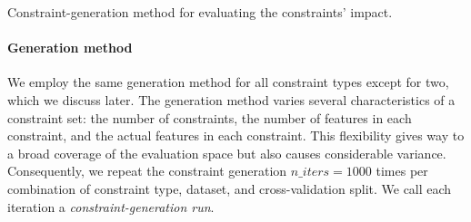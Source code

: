 \begin{algorithm}[t]
	\DontPrintSemicolon
	\BlankLine
	\caption{Constraint-generation method for evaluating the constraints' impact.}
	\label{al:syn:constraint-generation}
\end{algorithm}

\paragraph{Generation method} 

We employ the same generation method for all constraint types except for two, which we discuss later.
The generation method varies several characteristics of a constraint set:
the number of constraints, the number of features in each constraint, and the actual features in each constraint.
This flexibility gives way to a broad coverage of the evaluation space but also causes considerable variance.
Consequently, we repeat the constraint generation $\mathit{n\_iters} = 1000$ times per combination of constraint type, dataset, and cross-validation split.
We call each iteration a \emph{constraint-generation run}.

